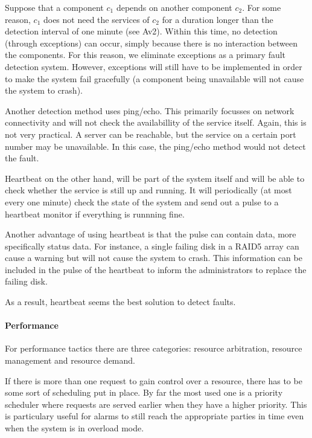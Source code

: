 \npar Suppose that a component $c_1$ depends on another component $c_2$. For
some reason, $c_1$ does not need the services of $c_2$ for a duration longer
than the detection interval of one minute (see Av2). Within this time, no
detection (through exceptions) can occur, simply because there is no interaction
between the components. For this reason, we eliminate exceptions as a primary
fault detection system. However, exceptions will still have to be implemented in
order to make the system fail gracefully (a component being unavailable will not
cause the system to crash).

\npar Another detection method uses ping/echo. This primarily focusses on
network connectivity and will not check the availabillity of the service itself.
Again, this is not very practical. A server can be reachable, but the service on
a certain port number may be unavailable. In this case, the ping/echo
method would not detect the fault.

\npar Heartbeat on the other hand, will be part of the system itself and will be
able to check whether the service is still up and running. It will periodically
(at most every one minute) check the state of the system and send out a pulse
to a heartbeat monitor if everything is runnning fine.

\npar Another advantage of using heartbeat is that the pulse can contain data,
more specifically status data. For instance, a single failing disk in a RAID5
array can cause a warning but will not cause the system to crash. This
information can be included in the pulse of the heartbeat to inform the
administrators to replace the failing disk.

\npar As a result, heartbeat seems the best solution to detect faults.

\paragraph{Performance}

\npar For performance tactics there are three categories: resource
arbitration, resource management and resource demand.

\npar If there is more than one request to gain control over a resource, there
has to be some sort of scheduling put in place. By far the most used one is a
priority scheduler where requests are served earlier when they have a higher priority.
This is particulary useful for alarms to still reach the appropriate parties in
time even when the system is in overload mode. 

